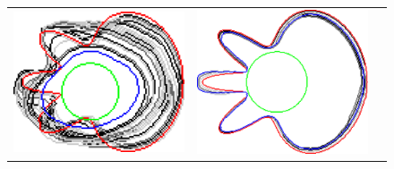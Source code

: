 \begin{figure}
\begin{tabular}{ccc}
\includegraphics[scale=0.25]{figures/chapter5/mdca-larger-neighborhood/flower/0.01/0.5/summary.pdf} &
\includegraphics[scale=0.25]{figures/chapter5/mdca-larger-neighborhood/flower/0.01/0.25/summary.pdf}\\[2em]


\end{tabular}
\end{figure}
